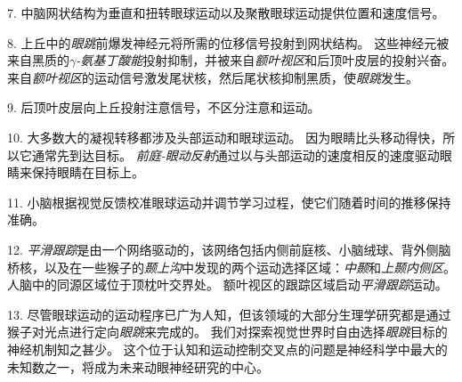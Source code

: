 7. 中脑网状结构为垂直和扭转眼球运动以及聚散眼球运动提供位置和速度信号。


8. 上丘中的\textit{眼跳}前爆发神经元将所需的位移信号投射到网状结构。
这些神经元被来自黑质的\textit{$ \gamma $-氨基丁酸能}投射抑制，并被来自\textit{额叶视区}和后顶叶皮层的投射兴奋。
来自\textit{额叶视区}的运动信号激发尾状核，然后尾状核抑制黑质，使\textit{眼跳}发生。


9. 后顶叶皮层向上丘投射注意信号，不区分注意和运动。


10. 大多数大的凝视转移都涉及头部运动和眼球运动。
因为眼睛比头移动得快，所以它通常先到达目标。
\textit{前庭-眼动反射}通过以与头部运动的速度相反的速度驱动眼睛来保持眼睛在目标上。


11. 小脑根据视觉反馈校准眼球运动并调节学习过程，使它们随着时间的推移保持准确。


12. \textit{平滑跟踪}是由一个网络驱动的，该网络包括内侧前庭核、小脑绒球、背外侧脑桥核，以及在一些猴子的\textit{颞上沟}中发现的两个运动选择区域：\textit{中颞}和\textit{上颞内侧区}。
人脑中的同源区域位于顶枕叶交界处。
额叶视区的跟踪区域启动\textit{平滑跟踪}运动。


13. 尽管眼球运动的运动程序已广为人知，但该领域的大部分生理学研究都是通过猴子对光点进行定向\textit{眼跳}来完成的。
我们对探索视觉世界时自由选择\textit{眼跳}目标的神经机制知之甚少。
这个位于认知和运动控制交叉点的问题是神经科学中最大的未知数之一，将成为未来动眼神经研究的中心。




